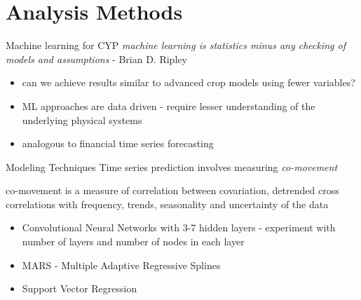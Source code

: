 \documentclass[10pt]{beamer}
\begin{document}
  \section{Analysis Methods}
  \begin{frame}{Machine learning for CYP}
  	\emph{machine learning is statistics minus any checking of models and assumptions} - Brian D. Ripley
  	\begin{itemize}
  		\item can we achieve results similar to advanced crop models using fewer variables?
  		\item ML approaches are data driven - require lesser understanding of the underlying physical systems
  		\item analogous to financial time series forecasting
  	\end{itemize}
  \end{frame}
  \begin{frame}{Modeling Techniques}
  	Time series prediction involves measuring \emph{co-movement}

  	co-movement is a measure of correlation between covariation, detrended cross correlations with frequency, trends, seasonality and uncertainty of the data
  	

	\begin{itemize}
	\item Convolutional Neural Networks with 3-7 hidden layers - experiment with number of layers and number of nodes in each layer
	\item MARS - Multiple Adaptive Regressive Splines
	\item Support Vector Regression
	\end{itemize}

  \end{frame}
\end{document}
